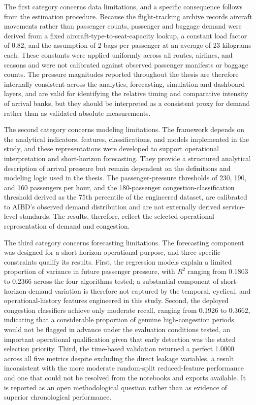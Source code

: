 The first category concerns data limitations, and a specific consequence follows from the estimation procedure. Because the flight-tracking archive records aircraft movements rather than passenger counts, passenger and baggage demand were derived from a fixed aircraft-type-to-seat-capacity lookup, a constant load factor of 0.82, and the assumption of 2 bags per passenger at an average of 23 kilograms each. These constants were applied uniformly across all routes, airlines, and seasons and were not calibrated against observed passenger manifests or baggage counts. The pressure magnitudes reported throughout the thesis are therefore internally consistent across the analytics, forecasting, simulation and dashboard layers, and are valid for identifying the relative timing and comparative intensity of arrival banks, but they should be interpreted as a consistent proxy for demand rather than as validated absolute measurements.

The second category concerns modeling limitations. The framework depends on the analytical indicators, features, classifications, and models implemented in the study, and these representations were developed to support operational interpretation and short-horizon forecasting. They provide a structured analytical description of arrival pressure but remain dependent on the definitions and modeling logic used in the thesis. The passenger-pressure thresholds of 230, 190, and 160 passengers per hour, and the 180-passenger congestion-classification threshold derived as the 75th percentile of the engineered dataset, are calibrated to AIBD’s observed demand distribution and are not externally derived service-level standards. The results, therefore, reflect the selected operational representation of demand and congestion.

The third category concerns forecasting limitations. The forecasting component was designed for a short-horizon operational purpose, and three specific constraints qualify its results. First, the regression models explain a limited proportion of variance in future passenger pressure, with $R^2$ ranging from 0.1803 to 0.2366 across the four algorithms tested; a substantial component of short-horizon demand variation is therefore not captured by the temporal, cyclical, and operational-history features engineered in this study. Second, the deployed congestion classifiers achieve only moderate recall, ranging from 0.1926 to 0.3662, indicating that a considerable proportion of genuine high-congestion periods would not be flagged in advance under the evaluation conditions tested, an important operational qualification given that early detection was the stated selection priority. Third, the time-based validation returned a perfect 1.0000 across all five metrics despite excluding the direct leakage variables, a result inconsistent with the more moderate random-split reduced-feature performance and one that could not be resolved from the notebooks and exports available. It is reported as an open methodological question rather than as evidence of superior chronological performance.

